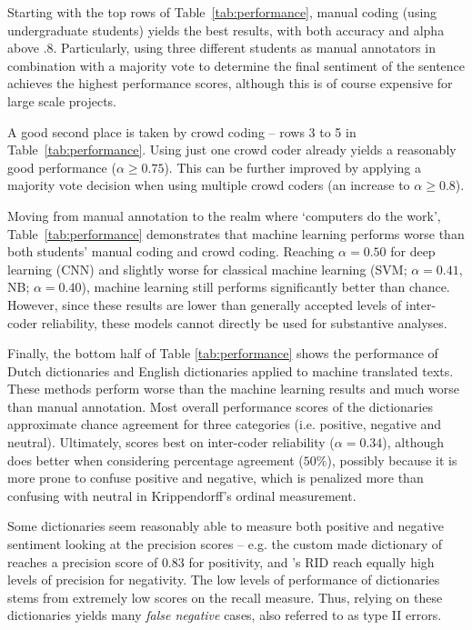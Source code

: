 Starting with the top rows of Table~\ref{tab:performance}, manual coding (using undergraduate students) yields the best results,
with both accuracy and alpha above .8. 
Particularly, using three different students as manual annotators in combination with a majority vote to determine the final sentiment of the sentence achieves the highest performance scores, although this is of course expensive for large scale projects.

A good second place is taken by crowd coding -- rows 3 to 5 in Table~\ref{tab:performance}.
Using just one crowd coder already yields a reasonably good performance ($\alpha\geq0.75$).
This can be further improved by applying a majority vote decision when using multiple crowd coders (an increase to $\alpha\geq0.8$).

Moving from manual annotation to the realm where `computers do the work', Table~\ref{tab:performance} demonstrates that machine learning performs worse than both students' manual coding and crowd coding.
Reaching $\alpha=0.50$ for deep learning (CNN) and slightly worse for classical machine learning (SVM; $\alpha=0.41$, NB; $\alpha=0.40$),
machine learning still performs significantly better than chance. 
However, since these results are lower than generally accepted levels of inter-coder reliability, these models cannot directly be used for substantive analyses.

Finally, the bottom half of Table \ref{tab:performance} shows the performance of Dutch dictionaries and English dictionaries applied to machine translated texts.
These methods perform worse than the machine learning results and much worse than manual annotation.
Most overall performance scores of the dictionaries approximate chance agreement for three categories (i.e. positive, negative and neutral).
Ultimately,  \cite{hu2004} scores best on inter-coder reliability ($\alpha=0.34$), although \cite{loughran2011} does better when considering percentage agreement ($50\%$), possibly because it is more prone to confuse positive and negative, which is penalized more than confusing with neutral in Krippendorff's ordinal measurement. 

Some dictionaries seem reasonably able to measure both positive and negative sentiment looking at the precision scores -- e.g. the custom made dictionary of \cite{damstra2018} reaches a precision score of $0.83$ for positivity, and \cite{martindale1975, martindale1992}'s RID reach equally high levels of precision for negativity. 
The low levels of performance of dictionaries stems from extremely low scores on the recall measure.
Thus, relying on these dictionaries yields many \emph{false negative} cases, also referred to as type II errors. 

